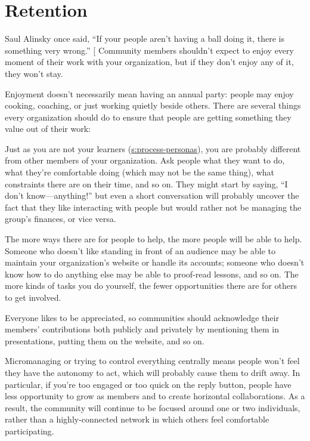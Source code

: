 \section{Retention}\label{s:community-retention}

Saul Alinsky once said, ``If your people aren't having a ball doing it,
there is something very wrong.'' {[}\protect[\hyperlink{b:Alin1989}{Alin1989}]{]} Community members
shouldn't expect to enjoy every moment of their work with your
organization, but if they don't enjoy any of it, they won't stay.

Enjoyment doesn't necessarily mean having an annual party: people may
enjoy cooking, coaching, or just working quietly beside others. There
are several things every organization should do to ensure that people
are getting something they value out of their work:

\begin{description}
\tightlist
\item[Ask people what they want rather than guessing.]
Just as you are not your learners (\protect\hyperlink{SECTION}{s:process-personas}),
you are probably different from other members of your organization.
Ask people what they want to do, what they're comfortable doing
(which may not be the same thing), what constraints there are on
their time, and so on. They might start by saying, ``I don't
know---anything!'' but even a short conversation will probably
uncover the fact that they like interacting with people but would
rather not be managing the group's finances, or vice versa.
\item[Provide many ways to contribute.]
The more ways there are for people to help, the more people will be
able to help. Someone who doesn't like standing in front of an
audience may be able to maintain your organization's website or
handle its accounts; someone who doesn't know how to do anything
else may be able to proof-read lessons, and so on. The more kinds of
tasks you do yourself, the fewer opportunities there are for others
to get involved.
\item[Recognize contributions.]
Everyone likes to be appreciated, so communities should acknowledge
their members' contributions both publicly and privately by
mentioning them in presentations, putting them on the website, and
so on.
\item[Make space.]
Micromanaging or trying to control everything centrally means people
won't feel they have the autonomy to act, which will probably cause
them to drift away. In particular, if you're too engaged or too
quick on the reply button, people have less opportunity to grow as
members and to create horizontal collaborations. As a result, the
community will continue to be focused around one or two individuals,
rather than a highly-connected network in which others feel
comfortable participating.
\end{description}

